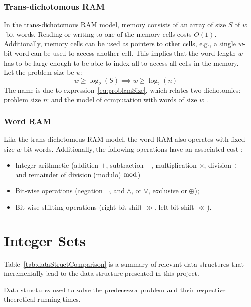 \subsubsection{Trans-dichotomous RAM}
In the trans-dichotomous RAM model, memory consists of an array of size $S$ of $w$-bit words.
Reading or writing to one of the memory cells costs $O(1)$.
Additionally, memory cells can be used as pointers to other cells, e.g., a single $w$-bit word can be used to access another cell.
This implies that the word length $w$ has to be large enough to be able to index all to access all cells in the memory.
Let the problem size be $n$:
\begin{equation}\label{eq:problemSize}
    w \ge \log_2(S) \implies w \ge \log_2(n)
\end{equation}
The name is due to expression~\ref{eq:problemSize}, which relates two dichotomies: problem size $n$; and the model of computation with words of size $w$ \cite{erikdemainelec11}. 

\subsubsection{Word RAM}
Like the trans-dichotomous RAM model, the word RAM also operates with fixed size $w$-bit words. Additionally, the following operations have an associated cost \cite{nelsonjelanilec1}:
\begin{itemize}
    \item Integer arithmetic (addition $+$, subtraction $-$, multiplication $\times$, division $\div$ and remainder of division (modulo) $\bmod$);
    \item Bit-wise operations (negation $\neg$, and $\wedge$, or $\vee$, exclusive or $\oplus$);
    \item Bit-wise shifting operations (right bit-shift $\gg$, left bit-shift $\ll$).
\end{itemize}

\section{Integer Sets}

Table~\ref{tab:dataStructComparison} is a summary of relevant data structures that incrementally lead to the data structure presented in this project.

\begin{table}[H]
\centering

\caption[Data structure comparison]{Data structures used to solve the predecessor problem and their respective theoretical running times.}
\label{tab:dataStructComparison}
\end{table}

